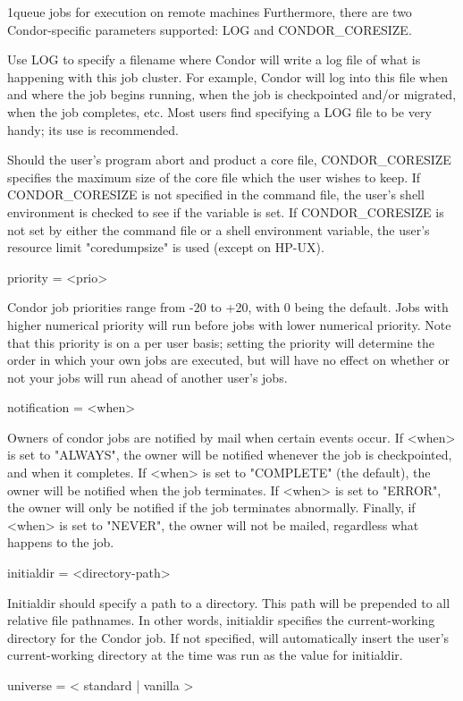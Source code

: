 \begin{ManPage}{}{1}{queue jobs for execution on remote machines}
Furthermore, there are two Condor-specific parameters supported: LOG and CONDOR\_CORESIZE. 

Use LOG to specify a filename where Condor will write a log file of what is happening with this job cluster. For example,
Condor will log into this file when and where the job begins running, when the job is checkpointed and/or migrated, when the
job completes, etc. Most users find specifying a LOG file to be very handy; its use is recommended. 

Should the user's program abort and product a core file, CONDOR\_CORESIZE specifies the maximum size of the core file
which the user wishes to keep. If CONDOR\_CORESIZE is not specified in the command file, the user's shell environment is
checked to see if the variable is set. If CONDOR\_CORESIZE is not set by either the command file or a shell environment
variable, the user's resource limit "coredumpsize" is used (except on HP-UX). 

priority = <prio> 

Condor job priorities range from -20 to +20, with 0 being the default. Jobs with higher numerical priority will run before jobs
with lower numerical priority. Note that this priority is on a per user basis; setting the priority will determine the order in which
your own jobs are executed, but will have no effect on whether or not your jobs will run ahead of another user's jobs. 

notification = <when> 

Owners of condor jobs are notified by mail when certain events occur. If <when> is set to "ALWAYS", the owner will be
notified whenever the job is checkpointed, and when it completes. If <when> is set to "COMPLETE" (the default), the owner
will be notified when the job terminates. If <when> is set to "ERROR", the owner will only be notified if the job terminates
abnormally. Finally, if <when> is set to "NEVER", the owner will not be mailed, regardless what happens to the job. 

initialdir = <directory-path> 

Initialdir should specify a path to a directory. This path will be prepended to all relative file pathnames. In other words,
initialdir specifies the current-working directory for the Condor job. If not specified,  will automatically insert
the user's current-working directory at the time  was run as the value for initialdir. 

universe = < standard | vanilla > 


\end{ManPage}
